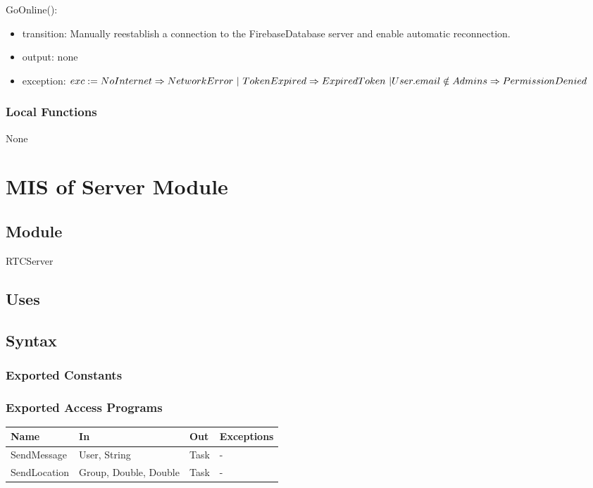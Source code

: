 \documentclass[12pt, titlepage]{article}
\begin{document}
\noindent GoOnline():
\begin{itemize}
\item transition: Manually reestablish a connection to the FirebaseDatabase server and enable automatic reconnection.
\item output: none
\item exception: $exc := NoInternet \Rightarrow NetworkError\ | \ TokenExpired \Rightarrow ExpiredToken\ | \\ User.email \notin Admins \Rightarrow PermissionDenied$
\end{itemize}

\subsubsection{Local Functions}

None

\newpage

\section{MIS of Server Module} \label{mServer}

\subsection{Module}

RTCServer

\subsection{Uses}

\subsection{Syntax}

\subsubsection{Exported Constants}

\subsubsection{Exported Access Programs}

\begin{center}
\begin{tabular}{p{2cm} p{4cm} p{4cm} p{2cm}}
\hline
\textbf{Name} & \textbf{In} & \textbf{Out} & \textbf{Exceptions} \\
\hline
SendMessage & User, String & Task & - \\
SendLocation & Group, Double, Double & Task & - \\

\hline
\end{tabular}
\end{center}
\end{document}
